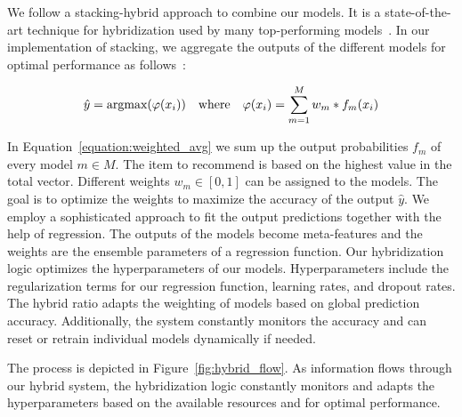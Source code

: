 We follow a stacking-hybrid approach to combine our models. It is a state-of-the-art technique for hybridization used by many top-performing models~\cite{geron2019hands,pavlyshenko2018using,sikora2015modified,dvzeroski2004combining}. In our implementation of stacking, we aggregate the outputs of the different models for optimal performance as follows~\cite{sagi2018ensemble}:

\begin{equation}
\setlength{\jot}{25pt}
    \begin{aligned}
        \hat{y}=\text{argmax}(\varphi (x_i)) \quad\text{where}\quad \varphi(x_i)= \sum\limits_{m=1}^M w_m*f_m(x_i)
    \end{aligned}
    \label{equation:weighted_avg}
\end{equation}

In Equation~\ref{equation:weighted_avg} we sum up the output probabilities $f_m$ of every model $m\in M$. The item to recommend is based on the highest value in the total vector. Different weights $w_m\in[0,1]$ can be assigned to the models. The goal is to optimize the weights to maximize the accuracy of the output $\hat{y}$. We employ a sophisticated approach to fit the output predictions together with the help of regression. The outputs of the models become meta-features and the weights are the ensemble parameters of a regression function. Our hybridization logic optimizes the hyperparameters of our models. Hyperparameters include the regularization terms for our regression function, learning rates, and dropout rates. The hybrid ratio adapts the weighting of models based on global prediction accuracy. Additionally, the system constantly monitors the accuracy and can reset or retrain individual models dynamically if needed.

The process is depicted in Figure~\ref{fig:hybrid_flow}. As information flows through our hybrid system, the hybridization logic constantly monitors and adapts the hyperparameters based on the available resources and for optimal performance.